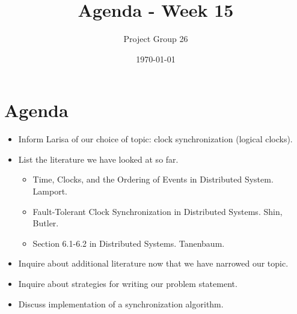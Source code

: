 \documentclass{article}
\title{Agenda - Week 15}
\author{Project Group 26}
\date{\today}
\begin{document}
\maketitle

\section{Agenda}

\begin{itemize}

    \item Inform Larisa of our choice of topic: clock synchronization (logical clocks).
    \item List the literature we have looked at so far.
    
    \begin{itemize}
        
        \item Time, Clocks, and the Ordering of Events in Distributed System. Lamport.
        \item Fault-Tolerant Clock Synchronization in Distributed Systems. Shin, Butler.
        \item Section 6.1-6.2 in Distributed Systems. Tanenbaum.
    
    \end{itemize}
    
    \item Inquire about additional literature now that we have narrowed our topic.
    \item Inquire about strategies for writing our problem statement.
    \item Discuss implementation of a synchronization algorithm.
    
    
\end{itemize}
\end{document}
